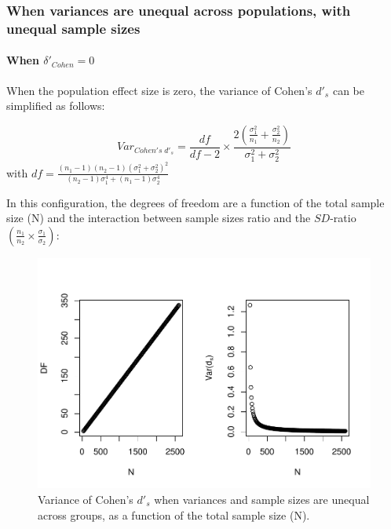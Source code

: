 \documentclass[
  man]{apa6}
\begin{document}
\hypertarget{when-variances-are-unequal-across-populations-with-unequal-sample-sizes-1}{%
\subsubsection{When variances are unequal across populations, with unequal sample sizes}\label{when-variances-are-unequal-across-populations-with-unequal-sample-sizes-1}}

\hypertarget{when-delta_cohen0-3}{%
\paragraph{\texorpdfstring{When \(\delta'_{Cohen}=0\)}{When \textbackslash delta'\_\{Cohen\}=0}}\label{when-delta_cohen0-3}}

When the population effect size is zero, the variance of Cohen's \(d'_s\) can be simplified as follows:

\[Var_{Cohen's \; d'_s} = \frac{df}{df-2} \times \frac{2\left( \frac{\sigma^2_1}{n_1} + \frac{\sigma^2_2}{n_2} \right)}{\sigma^2_1+\sigma^2_2}\]
with \(df =\frac{(n_1-1)(n_2-1)(\sigma^2_1+\sigma^2_2)^2}{(n_2-1)\sigma_1^4+(n_1-1)\sigma_2^4}\)

In this configuration, the degrees of freedom are a function of the total sample size (N) and the interaction between sample sizes ratio and the \(SD\)-ratio \(\left(\frac{n_1}{n_2}\times\frac{\sigma_1}{\sigma_2} \right)\):

\begin{figure}
\centering
\includegraphics{Theoretical-Variance-of-all-estimators-as-a-function-of-population-parameters_files/figure-latex/varcohendprimehetunbalNsize2-1.pdf}
\caption{\label{fig:varcohendprimehetunbalNsize2}Variance of Cohen's \(d'_s\) when variances and sample sizes are unequal across groups, as a function of the total sample size (N).}
\end{figure}
\end{document}
